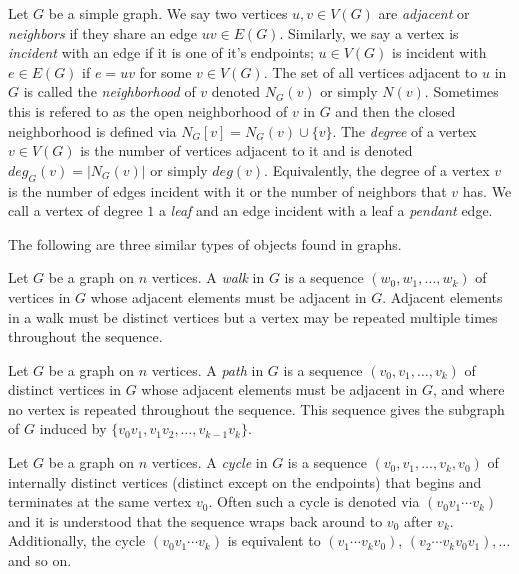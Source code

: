 Let $G$ be a simple graph. We say two vertices $u,v\in V(G)$ are \textit{adjacent} or \textit{neighbors} if they share an edge $uv\in E(G)$. Similarly, we say a vertex is \textit{incident} with an edge if it is one of it's endpoints; $u\in V(G)$ is incident with $e\in E(G)$ if $e=uv$ for some $v\in V(G)$. The set of all vertices adjacent to $u$ in $G$  is called the \textit{neighborhood} of $v$ denoted $N_{G}(v)$ or simply $N(v)$. Sometimes this is refered to as the open neighborhood of $v$ in $G$ and then the closed neighborhood is defined via $N_{G}[v]=N_{G}(v)\cup \{v\}$. The \textit{degree} of a vertex $v\in V(G)$ is the number of vertices adjacent to it and is denoted $deg_{G}(v)=|N_{G}(v)|$ or simply $deg(v)$. Equivalently, the degree of a vertex $v$ is the number of edges incident with it or the number of neighbors that $v$ has. We call a vertex of degree $1$ a \textit{leaf} and an edge incident with a leaf a \textit{pendant} edge.

The following are three similar types of objects found in graphs.

\begin{definition}[Walk]
Let $G$ be a graph on $n$ vertices. A \textit{walk} in $G$ is a sequence $(w_{0},w_{1},\hdots,w_{k})$ of vertices in $G$ whose adjacent elements must be adjacent in $G$. Adjacent elements in a walk must be distinct vertices but a vertex may be repeated multiple times throughout the sequence.
\end{definition}

\begin{definition}[Path]
Let $G$ be a graph on $n$ vertices. A \textit{path} in $G$ is a sequence $(v_{0},v_{1},\hdots,v_{k})$ of distinct vertices in $G$ whose adjacent elements must be adjacent in $G$, and where no vertex is repeated throughout the sequence. This sequence gives the subgraph of $G$ induced by $\{v_{0}v_{1},v_{1}v_{2},\hdots,v_{k-1}v_{k}\}$.
\end{definition}

\begin{definition}[Cycle]
Let $G$ be a graph on $n$ vertices. A \textit{cycle} in $G$ is a sequence $(v_{0},v_{1},\hdots,v_{k},v_{0})$ of internally distinct vertices (distinct except on the endpoints) that begins and terminates at the same vertex $v_{0}$. Often such a cycle is denoted via $(v_{0}v_{1}\cdots v_{k})$ and it is understood that the sequence wraps back around to $v_{0}$ after $v_{k}$. Additionally, the cycle $(v_{0}v_{1}\cdots v_{k})$ is equivalent to $(v_{1}\cdots v_{k}v_{0})$, $(v_{2}\cdots v_{k}v_{0}v_{1}),\hdots$ and so on. 
\end{definition}

